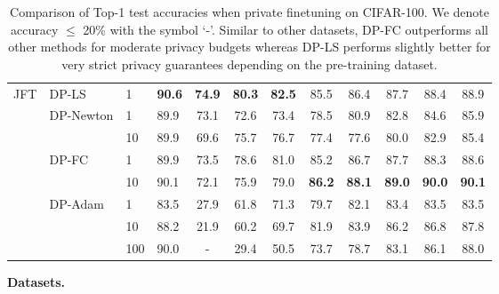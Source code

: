 \documentclass[letterpaper]{article} \usepackage{fullpage}
\begin{document}
\begin{table*}[!h]
\begin{tabular}{llll|cccccccc}
		\multirow{8}{*}{JFT} & \multirow{ 1}{*}{DP-LS}
		                                        & 1 & \textbf{90.6} & \textbf{74.9} & \textbf{80.3} & \textbf{82.5} & 85.5 & 86.4 & 87.7 & 88.4 & 88.9 \\ \addlinespace[0.1cm]
\addlinespace[0.1cm]
		            & \multirow{ 2}{*}{DP-Newton} & 1      & 89.9        & 73.1 & 72.6 & 73.4 & 78.5 & 80.9 & 82.8 & 84.6 & 85.9                    \\
		            &                             & 10     & 89.9        & 69.6 & 75.7 & 76.7 & 77.4 & 77.6 & 80.0 & 82.9 & 85.4                    \\
		\addlinespace[0.1cm]
\addlinespace[0.1cm]
		            & \multirow{ 2}{*}{DP-FC}     & 1      & 89.9        & 73.5 & 78.6 & 81.0 & 85.2 & 86.7 & 87.7 & 88.3 & 88.6                    \\
		            &                             & 10     & 90.1        & 72.1 & 75.9 & 79.0 & \textbf{86.2} & \textbf{88.1} & \textbf{89.0} & \textbf{90.0} & \textbf{90.1}                    \\
		\addlinespace[0.1cm]
\addlinespace[0.1cm]
		            & \multirow{ 3}{*}{DP-Adam}   & 1      & 83.5        & 27.9 & 61.8 & 71.3 & 79.7 & 82.1 & 83.4 & 83.5 & 83.5                    \\
		            &                             & 10     & 88.2        & 21.9 & 60.2 & 69.7 & 81.9 & 83.9 & 86.2 & 86.8 & 87.8                    \\
		            &                             & 100    & 90.0        & -   & 29.4 & 50.5 & 73.7 & 78.7 & 83.1 & 86.1 & 88.0                    \\
\bottomrule
	\end{tabular}
	\caption{Comparison of Top-1 test accuracies when private finetuning on CIFAR-100. We denote accuracy $\leq$ 20\% with the symbol `-'.  Similar to other datasets, DP-FC outperforms all other methods for moderate privacy budgets whereas DP-LS performs slightly better for very strict privacy guarantees depending on the pre-training dataset.}
	\label{tab:cifar100}
\end{table*}
\textbf{Datasets.} 
\end{document}
